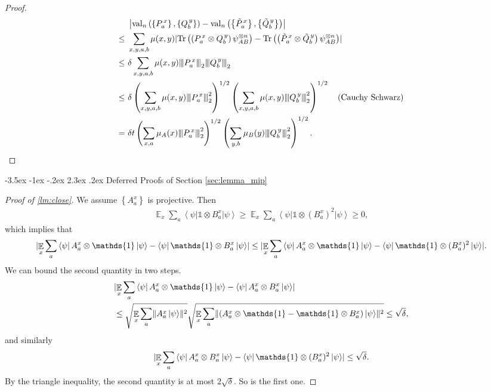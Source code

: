\documentclass[10pt,a4paper]{article}
\makeatletter
\renewcommand{\section}{\@startsection {section}{1}{\z@}%
             {-3.5ex \@plus -1ex \@minus -.2ex}%
             {2.3ex \@plus .2ex}%
             {\normalfont\Large\scshape\bfseries}}
\theoremstyle{plain}
\theoremstyle{definition}
\newcommand {\set} [1] {\ensuremath{ \left\lbrace #1 \right\rbrace }}
\newcommand {\br} [1] {\ensuremath{ \left( #1 \right) }}
\DeclarePairedDelimiter{\norm}{\lVert}{\rVert}
\newcommand {\ab} [1] {\ensuremath{ \left| #1 \right| }}
\DeclarePairedDelimiter{\abs}{\lvert}{\rvert}
\newcommand {\bra} [1] {\ensuremath{ \left\langle #1 \right| }}
\newcommand {\ket} [1] {\ensuremath{ \left| #1 \right\rangle }}
\DeclareMathOperator*{\bigE}{\mathbb{E}}
\newcommand{\nnorm}[1]{{\left\vert\kern-0.25ex\left\vert\kern-0.25ex\left\vert #1
		\right\vert\kern-0.25ex\right\vert\kern-0.25ex\right\vert}}
\newcommand {\Tr} {\ensuremath{ \mathrm{Tr} }}
\newcommand {\id} {\ensuremath{\mathds{1}}}
\newcommand{\gval}[3]{\ensuremath{\mathrm{val}_{#1}\br{\set{#2},\set{#3}}}}
\newcommand{\Pss} {\ensuremath{P^{\,x}_a}}
\newcommand{\Qss} {\ensuremath{Q^{\,y}_b}}
\newcommand{\Pwss} {\ensuremath{\tilde{P}^{\,x}_a}}
\newcommand{\Qwss} {\ensuremath{\tilde{Q}^{\,y}_b}}
\newcommand{\x}{\otimes}
\newcommand{\1}{\mathbb{1}} %
\makeatother
\begin{document}
\begin{proof}
\begin{align*}
&\ab{\gval{n}{\Pss}{\Qss}-\gval{n}{\Pwss}{\Qwss}}\\
\leq~&\sum_{x,y,a,b}\mu(x,y)\abs{\Tr\br{\br{\Pss\otimes \Qss}\psi_{AB}^{\otimes n}}-\Tr\br{\br{\Pwss\otimes \Qwss}\psi_{AB}^{\otimes n}}}\\
\leq~&\delta\sum_{x,y,a,b}\mu(x,y)\nnorm{\Pss}_2\nnorm{\Qss}_2\\
\leq~&\delta\br{\sum_{x,y,a,b}\mu(x,y)\nnorm{\Pss}_2^2}^{1/2}\br{\sum_{x,y,a,b}\mu(x,y)\nnorm{\Qss}_2^2}^{1/2}\quad\mbox{(Cauchy Schwarz)}\\
=~&\delta t\br{\sum_{x,a}\mu_A(x)\nnorm{\Pss}_2^2}^{1/2}\br{\sum_{y,b}\mu_B(y)\nnorm{\Qss}_2^2}^{1/2}.
\end{align*}
\end{proof}


%
\section{Deferred Proofs of Section \ref{sec:lemma_mip}}
\label{sec:ans}
\begin{proof}[Proof of \cref{lm:close}]
    We assume $\set{A^x_a}$ is projective. Then 
	\begin{align*}
		\bigE_x \sum_a \bra{\psi} \id \x B^x_a \ket{\psi} \geq \bigE_x \sum_a \bra{\psi} \id \x (B^x_a)^2  \ket{\psi} \geq 0,
	\end{align*}
	which implies that 
	\begin{align*}
		\abs{ \bigE_x \sum_a \bra{\psi} A^x_a \x \id \ket{\psi} -\bra{\psi} \id\x B^x_a \ket{\psi}} \leq 
		\abs{ \bigE_x \sum_a \bra{\psi} A^x_a \x \id \ket{\psi} -\bra{\psi} \id\x (B^x_a)^2 \ket{\psi}}.
	\end{align*}
	We can bound the second quantity in two steps.
	\begin{align*}
		&\abs{ \bigE_x \sum_a \bra{\psi} A^x_a\x \id \ket{\psi} - \bra{\psi} A^x_a \x B^x_a \ket{\psi}} \\
		&\leq \sqrt{\bigE_x \sum_a \norm{ A^x_a\ket{\psi}}^2} \sqrt{ \bigE_x \sum_a \norm{ (A^x_a \x \id - \id\x B^x_a)\ket{\psi}}^2} \leq \sqrt{\delta},
	\end{align*}
	and similarly
	\begin{align*}
		\abs{ \bigE_x \sum_a \bra{\psi} A^x_a\x B^x_a \ket{\psi} - \bra{\psi} \id \x (B^x_a)^2 \ket{\psi}} \leq \sqrt{\delta}.
	\end{align*}
        By the triangle inequality, the second quantity is at most $2\sqrt{\delta}$. So is the first one.
\end{proof}
\end{document}
